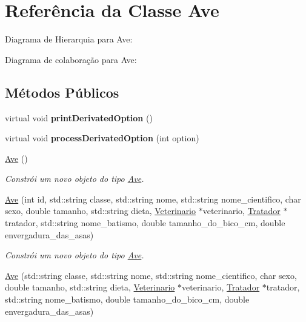 \hypertarget{classAve}{}\section{Referência da Classe Ave}
\label{classAve}


Diagrama de Hierarquia para Ave\+:


Diagrama de colaboração para Ave\+:
\subsection*{Métodos Públicos}
\begin{DoxyCompactItemize}
\item 
\mbox{\label{classAve_aab1b7a2bf21d8c0dd04a8c08d26799bd}} 
virtual void {\bfseries print\+Derivated\+Option} ()
\item 
\mbox{\label{classAve_a039a7d8015e2f3fe9355b3eaaa787a25}} 
virtual void {\bfseries process\+Derivated\+Option} (int option)
\item 
\mbox{\label{classAve_a31bc97c3258df566381300c8b9abc73a}} 
\hyperlink{classAve_a31bc97c3258df566381300c8b9abc73a}{Ave} ()
\begin{DoxyCompactList}\small\item\em Constrói um novo objeto do tipo \hyperlink{classAve}{Ave}. \end{DoxyCompactList}\item 
\hyperlink{classAve_aa1a19a4a964c41107df2886261f055e8}{Ave} (int id, std\+::string classe, std\+::string nome, std\+::string nome\+\_\+cientifico, char sexo, double tamanho, std\+::string dieta, \hyperlink{classVeterinario}{Veterinario} $\ast$veterinario, \hyperlink{classTratador}{Tratador} $\ast$tratador, std\+::string nome\+\_\+batismo, double tamanho\+\_\+do\+\_\+bico\+\_\+cm, double envergadura\+\_\+das\+\_\+asas)
\begin{DoxyCompactList}\small\item\em Constrói um novo objeto do tipo \hyperlink{classAve}{Ave}. \end{DoxyCompactList}\item 
\hyperlink{classAve_a5bd72e6267c5159c50dc2ef89fa8e377}{Ave} (std\+::string classe, std\+::string nome, std\+::string nome\+\_\+cientifico, char sexo, double tamanho, std\+::string dieta, \hyperlink{classVeterinario}{Veterinario} $\ast$veterinario, \hyperlink{classTratador}{Tratador} $\ast$tratador, std\+::string nome\+\_\+batismo, double tamanho\+\_\+do\+\_\+bico\+\_\+cm, double envergadura\+\_\+das\+\_\+asas)

\end{DoxyCompactItemize}
